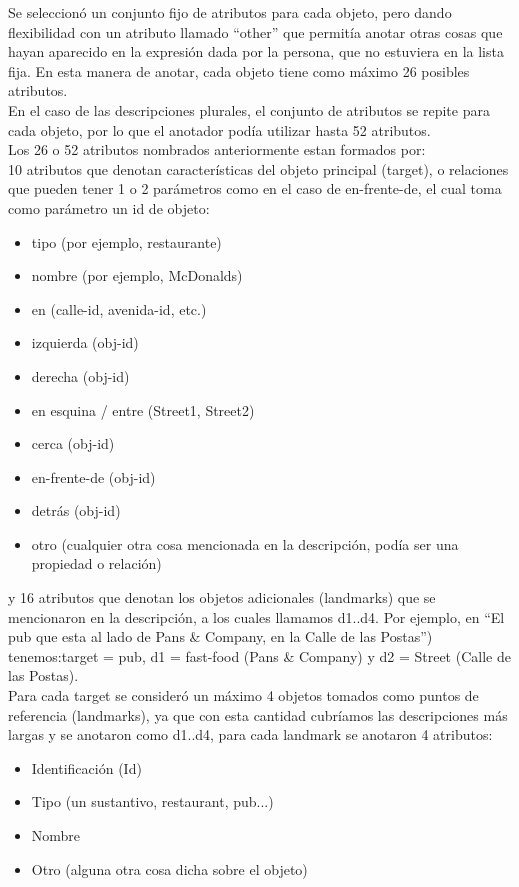 
Se seleccion\'o un conjunto fijo de atributos para cada objeto, pero dando flexibilidad con un atributo llamado ``other'' que permit\'ia anotar otras cosas que hayan aparecido en la expresi\'on dada por la persona, que no estuviera en la lista fija. En esta manera de anotar, cada objeto tiene como m\'aximo 26 posibles atributos.\\

En el caso de las descripciones plurales, el conjunto de atributos se repite para cada objeto, por lo que el anotador pod\'{i}a utilizar hasta 52 atributos.\\

Los 26 o 52 atributos nombrados anteriormente estan formados por:\\
10 atributos que denotan caracter\'isticas del objeto principal (target), o relaciones que pueden tener 1 o 2 par\'ametros como en el caso de en-frente-de, el cual toma como par\'ametro un id de objeto:
\begin{itemize}
  \item tipo (por ejemplo, restaurante)
  \item nombre (por ejemplo, McDonalds)
  \item en (calle-id, avenida-id, etc.)
  \item izquierda (obj-id)
  \item derecha (obj-id)
  \item en esquina / entre (Street1, Street2)
  \item cerca (obj-id)
  \item en-frente-de (obj-id)
  \item detr\'as (obj-id)
  \item otro (cualquier otra cosa mencionada en la descripci\'on, pod\'ia ser una propiedad o relaci\'on)
\end{itemize}
y 16 atributos que denotan los objetos adicionales (landmarks) que se mencionaron en la descripci\'on, a los cuales llamamos d1..d4. Por ejemplo, en ``El pub que esta al lado de Pans \& Company, en la Calle de las Postas'') tenemos:target = pub, d1 = fast-food (Pans \& Company) y d2 = Street (Calle de las Postas).\\

Para cada target se consider\'o un m\'aximo 4 objetos tomados como puntos de referencia (landmarks), ya que con esta cantidad cubr\'iamos las descripciones m\'as largas y se anotaron como d1..d4, para cada landmark se anotaron 4 atributos:
\begin{itemize}
  \item Identificaci\'on (Id)
  \item Tipo (un sustantivo, restaurant, pub...)
  \item Nombre
  \item Otro (alguna otra cosa dicha sobre el objeto)
\end{itemize}

